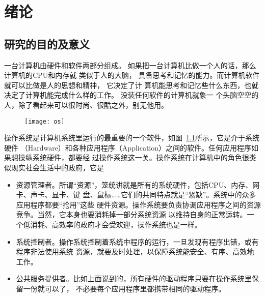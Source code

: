 \documentclass{swfuthesism}
\begin{document}
\frontmatter          
\makepreliminarypages%
\tableofcontents     %
\listoffigures       %
\listoflistings
\listoffixmes{}

\mainmatter{}

\chapter{绪论}

\section{研究的目的及意义}

一台计算机由硬件和软件两部分组成。 如果把一台计算机比做一个人的话，那么计算机的CPU和内存就
类似于人的大脑， 具备思考和记忆的能力。而计算机软件就可以比做是人的思想和精神， 它决定了计
算机能思考和记忆些什么东西，也就决定了计算机能完成什么样的工作。 没装任何软件的计算机就象一
个头脑空空的人，除了看起来可以很时尚、很酷之外，别无他用。

\begin{figure}
  \centering
  \texttt{[image: os]}
  \label{fig:os}
\end{figure}

操作系统是计算机系统里运行的最重要的一个软件，如图~\ref{fig:os}所示，它是介于系统硬件
（Hardware）和各种应用程序（Application）之间的软件。任何应用程序如果想操纵系统硬件，都要经
过操作系统这一关。操作系统在计算机中的角色很类似现实社会生活中的政府，它是
\begin{itemize}
\item 资源管理者。所谓“资源”，笼统讲就是所有的系统硬件，包括CPU、内存、网卡、声卡、显卡、键
  盘、鼠标\ldots{}\ldots{}它们的共同特点就是``紧缺''。系统中的众多应用程序都要``抢用''这些
  硬件资源。操作系统要负责协调应用程序之间的资源竞争。当然，它本身也要消耗掉一部分系统资源
  以维持自身的正常运转。一个低消耗、高效率的政府才会受欢迎，操作系统也是一样。
\item 系统控制者。操作系统控制着系统中程序的运行，一旦发现有程序出错，或有程序非法使用系统
  资源，就要及时处理，以保障系统能安全、有序、高效地工作。
\item 公共服务提供者。比如上面说到的，所有硬件的驱动程序只要在操作系统里保留一份就可以了，
  不必要每个应用程序里都携带相同的驱动程序。
\end{itemize}

\end{document}
